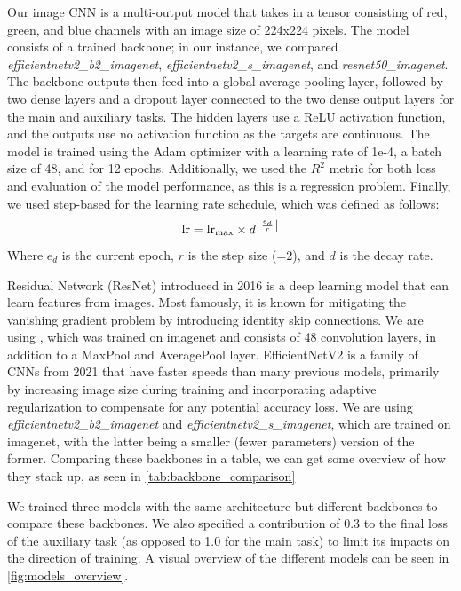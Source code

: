 \documentclass[12pt,a4paper,oneside]{article}
\begin{document}
Our image CNN is a multi-output model that takes in a tensor consisting of red, green, and blue channels with an image size of 224x224 pixels. The model consists of a trained backbone; in our instance, we compared \textit{efficientnetv2\_b2\_imagenet}, \textit{efficientnetv2\_s\_imagenet}, and \textit{resnet50\_imagenet}. The backbone outputs then feed into a global average pooling layer, followed by two dense layers and a dropout layer connected to the two dense output layers for the main and auxiliary tasks. The hidden layers use a ReLU activation function, and the outputs use no activation function as the targets are continuous. The model is trained using the Adam optimizer with a learning rate of 1e-4, a batch size of 48, and for 12 epochs. Additionally, we used the $R^2$ metric for both loss and evaluation of the model performance, as this is a regression problem. Finally, we used step-based for the learning rate schedule, which was defined as follows:
\[
    \text{lr} = \text{lr}_\text{max} \times d^{\floor*{\frac{e_d}{r}}}
\]
Where $e_d$ is the current epoch, $r$ is the step size (=2), and $d$ is the decay rate.

\smallskip
Residual Network (ResNet) \cite{he2016identity} introduced in 2016 is a deep learning model that can learn features from images. Most famously, it is known for mitigating the vanishing gradient problem by introducing identity skip connections. We are using , which was trained on imagenet and consists of 48 convolution layers, in addition to a MaxPool and AveragePool layer. EfficientNetV2 \cite{tan2021efficientnetv2} is a family of CNNs from 2021 that have faster speeds than many previous models, primarily by increasing image size during training and incorporating adaptive regularization to compensate for any potential accuracy loss. We are using \textit{efficientnetv2\_b2\_imagenet} and \textit{efficientnetv2\_s\_imagenet}, which are trained on imagenet, with the latter being a smaller (fewer parameters) version of the former. Comparing these backbones in a table, we can get some overview of how they stack up, as seen in \ref{tab:backbone_comparison}

We trained three models with the same architecture but different backbones to compare these backbones. We also specified a contribution of 0.3 to the final loss of the auxiliary task (as opposed to 1.0 for the main task) to limit its impacts on the direction of training. A visual overview of the different models can be seen in \ref{fig:models_overview}. 
\end{document}
